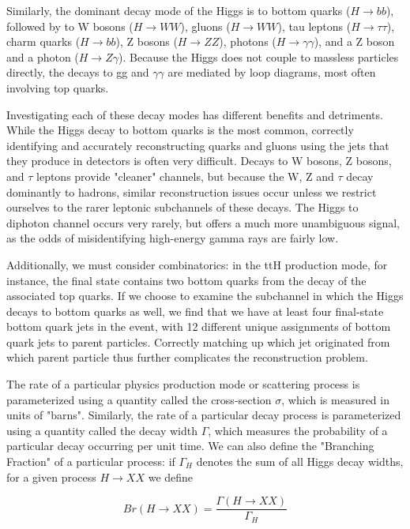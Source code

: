 Similarly, the dominant decay mode of the Higgs is to bottom quarks ($H \rightarrow bb$), followed by to W bosons ($H \rightarrow WW$), gluons ($H \rightarrow WW$), tau leptons ($H \rightarrow \tau \tau$), charm quarks ($H \rightarrow bb$), Z bosons ($H \rightarrow ZZ$), photons ($H \rightarrow \gamma \gamma$), and a Z boson and a photon ($H \rightarrow Z \gamma$). Because the Higgs does not couple to massless particles directly, the decays to gg and $\gamma \gamma$ are mediated by loop diagrams, most often involving top quarks.

Investigating each of these decay modes has different benefits and detriments. While the Higgs decay to bottom quarks is the most common, correctly identifying and accurately reconstructing quarks and gluons using the jets that they produce in detectors is often very difficult. Decays to W bosons, Z bosons, and $\tau$ leptons provide "cleaner" channels, but because the W, Z and $\tau$ decay dominantly to hadrons, similar reconstruction issues occur unless we restrict ourselves to the rarer leptonic subchannels of these decays. The Higgs to diphoton channel occurs very rarely, but offers a much more unambiguous signal, as the odds of misidentifying high-energy gamma rays are fairly low.

Additionally, we must consider combinatorics: in the ttH production mode, for instance, the final state contains two bottom quarks from the decay of the associated top quarks. If we choose to examine the subchannel in which the Higgs decays to bottom quarks as well, we find that we have at least four final-state bottom quark jets in the event, with 12 different unique assignments of bottom quark jets to parent particles. Correctly matching up which jet originated from which parent particle thus further complicates the reconstruction problem.

The rate of a particular physics production mode or scattering process is parameterized using a quantity called the cross-section $\sigma$, which is measured in units of "barns". Similarly, the rate of a particular decay process is parameterized using a quantity called the decay width $\Gamma$, which measures the probability of a particular decay occurring per unit time. We can also define the "Branching Fraction" of a particular process: if $\Gamma_{H}$ denotes the sum of all Higgs decay widths, for a given process $H \rightarrow XX$ we define

\begin{equation}
Br(H \rightarrow XX) = \frac{\Gamma(H \rightarrow XX)}{\Gamma_{H}}
\end{equation}

